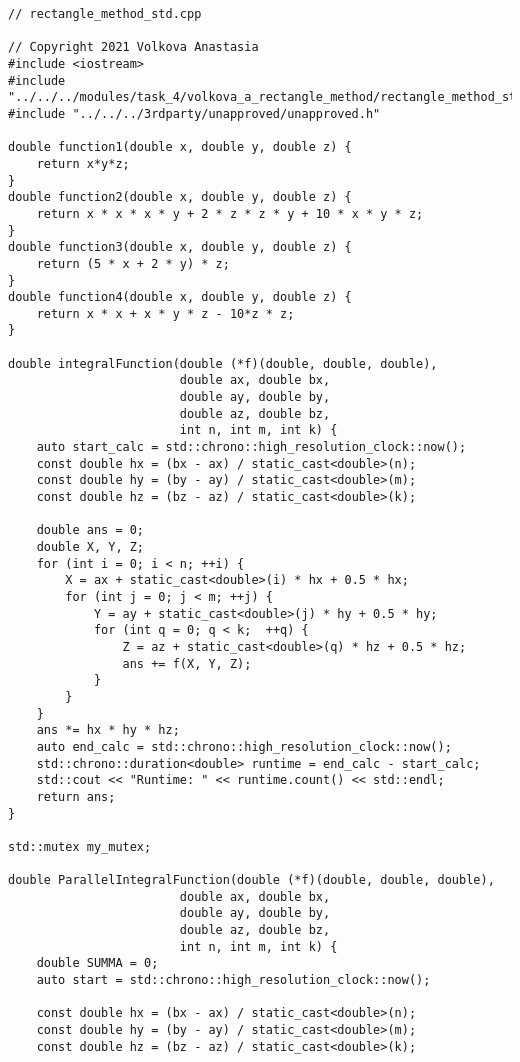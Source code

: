 \documentclass{report}
\begin{document}
\begin{lstlisting}
// rectangle_method_std.cpp

// Copyright 2021 Volkova Anastasia
#include <iostream>
#include "../../../modules/task_4/volkova_a_rectangle_method/rectangle_method_std.h"
#include "../../../3rdparty/unapproved/unapproved.h"

double function1(double x, double y, double z) {
    return x*y*z;
}
double function2(double x, double y, double z) {
    return x * x * x * y + 2 * z * z * y + 10 * x * y * z;
}
double function3(double x, double y, double z) {
    return (5 * x + 2 * y) * z;
}
double function4(double x, double y, double z) {
    return x * x + x * y * z - 10*z * z;
}

double integralFunction(double (*f)(double, double, double),
                        double ax, double bx,
                        double ay, double by,
                        double az, double bz,
                        int n, int m, int k) {
    auto start_calc = std::chrono::high_resolution_clock::now();
    const double hx = (bx - ax) / static_cast<double>(n);
    const double hy = (by - ay) / static_cast<double>(m);
    const double hz = (bz - az) / static_cast<double>(k);

    double ans = 0;
    double X, Y, Z;
    for (int i = 0; i < n; ++i) {
        X = ax + static_cast<double>(i) * hx + 0.5 * hx;
        for (int j = 0; j < m; ++j) {
            Y = ay + static_cast<double>(j) * hy + 0.5 * hy;
            for (int q = 0; q < k;  ++q) {
                Z = az + static_cast<double>(q) * hz + 0.5 * hz;
                ans += f(X, Y, Z);
            }
        }
    }
    ans *= hx * hy * hz;
    auto end_calc = std::chrono::high_resolution_clock::now();
    std::chrono::duration<double> runtime = end_calc - start_calc;
    std::cout << "Runtime: " << runtime.count() << std::endl;
    return ans;
}

std::mutex my_mutex;

double ParallelIntegralFunction(double (*f)(double, double, double),
                        double ax, double bx,
                        double ay, double by,
                        double az, double bz,
                        int n, int m, int k) {
    double SUMMA = 0;
    auto start = std::chrono::high_resolution_clock::now();

    const double hx = (bx - ax) / static_cast<double>(n);
    const double hy = (by - ay) / static_cast<double>(m);
    const double hz = (bz - az) / static_cast<double>(k);


\end{lstlisting}
\end{document}
